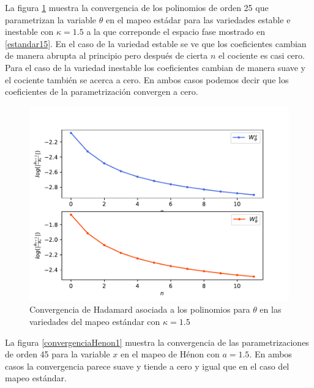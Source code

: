 La figura \ref{convergenciaEst15} muestra la convergencia de los polinomios de orden 25 que parametrizan la variable $\theta$ en el mapeo estádar para las variedades estable e inestable con $\kappa=1.5$ a la que correponde el espacio fase mostrado en \ref{estandar15}. En el caso de la variedad estable se ve que los coeficientes cambian de manera abrupta al principio pero después de cierta $n$ el cociente es casi cero. Para el caso de la variedad inestable los coeficientes cambian de manera suave y el cociente también se acerca a cero. En ambos casos podemos decir que los coeficientes de la parametrización convergen a cero.  
\begin{figure}[H]
\centering
\includegraphics[scale=0.6]{converEst15}
\caption{Convergencia de Hadamard asociada a los polinomios para $\theta$ en las variedades del mapeo estándar con $\kappa=1.5$}
\label{convergenciaEst15}
\end{figure}

La figura \ref{convergenciaHenon1} muestra la convergencia de las parametrizaciones de orden 45 para la variable $x$ en el mapeo de Hénon con $a=1.5$. En ambos casos la convergencia parece suave y tiende a cero y igual que en el caso del mapeo estándar.

